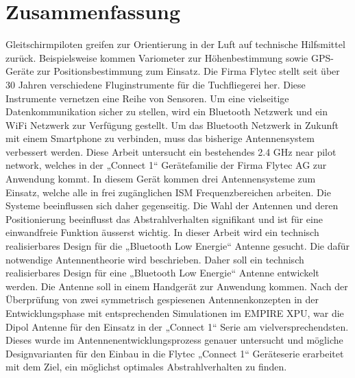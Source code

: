 \section*{Zusammenfassung}

Gleitschirmpiloten greifen zur Orientierung in der Luft auf technische Hilfsmittel zurück. Beispielsweise kommen Variometer zur Höhenbestimmung sowie GPS-Geräte zur Positionsbestimmung zum Einsatz. Die Firma Flytec stellt seit über 30 Jahren verschiedene Fluginstrumente für die Tuchfliegerei her. Diese Instrumente vernetzen eine Reihe von Sensoren. Um eine vielseitige Datenkommunikation sicher zu stellen, wird ein Bluetooth Netzwerk und ein WiFi Netzwerk zur Verfügung gestellt. Um das Bluetooth Netzwerk in Zukunft mit einem Smartphone zu verbinden, muss das bisherige Antennensystem verbessert werden.
Diese Arbeit untersucht ein bestehendes 2.4 GHz \glqq near pilot network\grqq , welches in der „Connect 1“ Gerätefamilie der Firma Flytec AG zur Anwendung kommt. In diesem  Gerät kommen drei Antennensysteme zum Einsatz, welche alle in frei zugänglichen ISM Frequenzbereichen arbeiten. Die Systeme beeinflussen sich daher gegenseitig. Die Wahl der Antennen und deren Positionierung beeinflusst das Abstrahlverhalten signifikant und ist für eine einwandfreie Funktion äusserst wichtig. In dieser Arbeit wird ein technisch realisierbares Design für die „Bluetooth Low Energie“ Antenne gesucht. Die dafür notwendige Antennentheorie wird beschrieben. Daher soll ein technisch realisierbares Design für eine „Bluetooth Low Energie“ Antenne entwickelt werden. Die Antenne soll in einem Handgerät zur Anwendung kommen. Nach der Überprüfung von zwei symmetrisch gespiesenen Antennenkonzepten in der Entwicklungsphase mit entsprechenden Simulationen im EMPIRE XPU, war die Dipol Antenne für den Einsatz in der „Connect 1“ Serie am vielversprechendsten. Dieses wurde im Antennenentwicklungsprozess genauer untersucht und mögliche Designvarianten für den Einbau in die Flytec „Connect 1“ Geräteserie erarbeitet mit dem Ziel, ein möglichst optimales Abstrahlverhalten zu finden.
